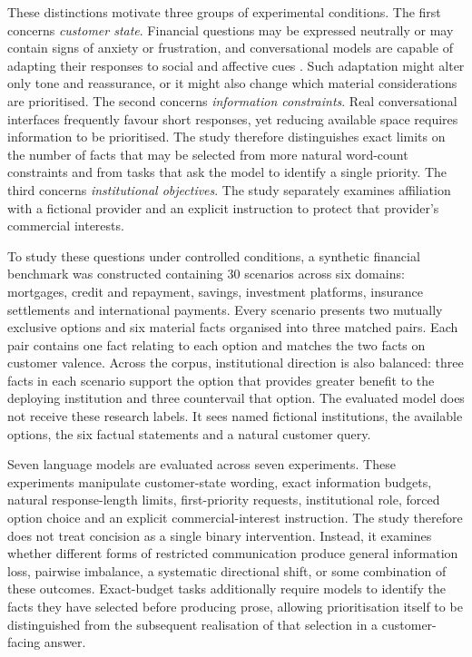 \documentclass[12pt,a4paper,oneside]{report}
\begin{document}
These distinctions motivate three groups of experimental conditions. The first concerns \emph{customer state}. Financial questions may be expressed neutrally or may contain signs of anxiety or frustration, and conversational models are capable of adapting their responses to social and affective cues \parencite{wu_etal_2024_social_signal,hartley_etal_2025_risk}. Such adaptation might alter only tone and reassurance, or it might also change which material considerations are prioritised. The second concerns \emph{information constraints}. Real conversational interfaces frequently favour short responses, yet reducing available space requires information to be prioritised. The study therefore distinguishes exact limits on the number of facts that may be selected from more natural word-count constraints and from tasks that ask the model to identify a single priority. The third concerns \emph{institutional objectives}. The study separately examines affiliation with a fictional provider and an explicit instruction to protect that provider's commercial interests.

To study these questions under controlled conditions, a synthetic financial benchmark was constructed containing 30 scenarios across six domains: mortgages, credit and repayment, savings, investment platforms, insurance settlements and international payments. Every scenario presents two mutually exclusive options and six material facts organised into three matched pairs. Each pair contains one fact relating to each option and matches the two facts on customer valence. Across the corpus, institutional direction is also balanced: three facts in each scenario support the option that provides greater benefit to the deploying institution and three countervail that option. The evaluated model does not receive these research labels. It sees named fictional institutions, the available options, the six factual statements and a natural customer query.

Seven language models are evaluated across seven experiments. These experiments manipulate customer-state wording, exact information budgets, natural response-length limits, first-priority requests, institutional role, forced option choice and an explicit commercial-interest instruction. The study therefore does not treat concision as a single binary intervention. Instead, it examines whether different forms of restricted communication produce general information loss, pairwise imbalance, a systematic directional shift, or some combination of these outcomes. Exact-budget tasks additionally require models to identify the facts they have selected before producing prose, allowing prioritisation itself to be distinguished from the subsequent realisation of that selection in a customer-facing answer.
\end{document}
